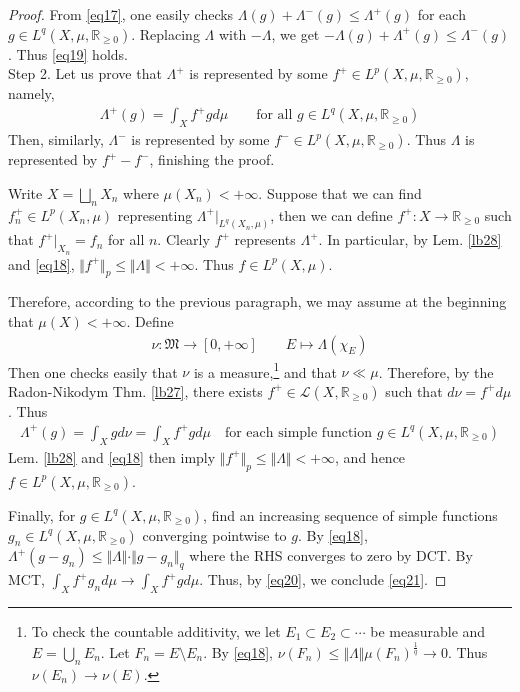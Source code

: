 \documentclass[12pt,b5paper,notitlepage]{article}
\theoremstyle{definition}
\theoremstyle{plain}
\newcommand{\fk}{\mathfrak}
\newcommand{\mc}{\mathcal}
\newcommand{\Rbb}{\mathbb R}
\numberwithin{equation}{section}
\begin{document}
\begin{proof}[Proof]
From \eqref{eq17}, one easily checks $\Lambda(g)+\Lambda^-(g)\leq\Lambda^+(g)$ for each $g\in L^q(X,\mu,\Rbb_{\geq0})$. Replacing $\Lambda$ with $-\Lambda$, we get $-\Lambda(g)+\Lambda^+(g)\leq \Lambda^-(g)$. Thus \eqref{eq19} holds.\\[-1ex]




Step 2. Let us prove that $\Lambda^+$ is represented by some $f^+\in L^p(X,\mu,\Rbb_{\geq0})$, namely,
\begin{align}\label{eq21}
\Lambda^+(g)=\int_X f^+gd\mu\qquad\text{for all }g\in L^q(X,\mu,\Rbb_{\geq0})
\end{align}
Then, similarly, $\Lambda^-$ is represented by some $f^-\in L^p(X,\mu,\Rbb_{\geq0})$. Thus $\Lambda$ is represented by $f^+-f^-$, finishing the proof.

Write $X=\bigsqcup_n X_n$ where $\mu(X_n)<+\infty$. Suppose that we can find $f_n^+\in L^p(X_n,\mu)$ representing $\Lambda^+|_{L^q(X_n,\mu)}$, then we can define $f^+:X\rightarrow\Rbb_{\geq0}$ such that $f^+|_{X_n}=f_n$ for all $n$. Clearly $f^+$ represents $\Lambda^+$. In particular, by Lem. \ref{lb28} and \eqref{eq18}, $\Vert f^+\Vert_p\leq\Vert\Lambda\Vert<+\infty$. Thus $f\in L^p(X,\mu)$.


Therefore, according to the previous paragraph, we may assume at the beginning that $\mu(X)<+\infty$. Define
\begin{align*}
\nu:\fk M\rightarrow[0,+\infty]\qquad E\mapsto \Lambda(\chi_E)
\end{align*}
Then one checks easily that $\nu$ is a measure,\footnote{To check the countable additivity, we let $E_1\subset E_2\subset\cdots$ be measurable and $E=\bigcup_n E_n$. Let $F_n=E\setminus E_n$. By \eqref{eq18}, $\nu(F_n)\leq\Vert\Lambda\Vert\mu(F_n)^{\frac 1q}\rightarrow0$. Thus $\nu(E_n)\rightarrow\nu(E)$.} and that $\nu\ll\mu$. Therefore, by the Radon-Nikodym Thm. \ref{lb27}, there exists $f^+\in\mc L(X,\Rbb_{\geq0})$ such that $d\nu=f^+d\mu$. Thus
\begin{align}\label{eq20}
\Lambda^+(g)=\int_X gd\nu=\int_X f^+gd\mu\quad\text{for each simple function $g\in L^q(X,\mu,\Rbb_{\geq0})$}
\end{align}
Lem. \ref{lb28} and \eqref{eq18} then imply $\Vert f^+\Vert_p\leq \Vert\Lambda\Vert<+\infty$, and hence $f\in L^p(X,\mu,\Rbb_{\geq0})$. 

Finally, for $g\in L^q(X,\mu,\Rbb_{\geq0})$, find an increasing sequence of simple functions $g_n\in L^q(X,\mu,\Rbb_{\geq0})$ converging pointwise to $g$. By \eqref{eq18}, $\Lambda^+(g-g_n)\leq \Vert\Lambda\Vert\cdot\Vert g-g_n\Vert_q$ where the RHS converges to zero by DCT. By MCT, $\int_Xf^+g_nd\mu\rightarrow\int_X f^+gd\mu$. Thus, by \eqref{eq20}, we conclude \eqref{eq21}.
\end{proof}
\end{document}
